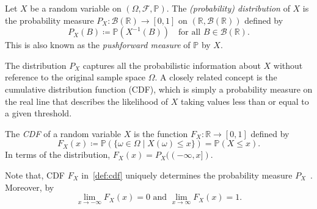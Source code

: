 \begin{definition}
    Let $X$ be a random variable on $(\Omega, \mathcal{F}, \mathbb{P})$. The \emph{(probability) distribution} of $X$ is the probability measure $P_X:\mathcal{B}(\mathbb{R}) \to [0, 1]$ on $(\mathbb{R}, \mathcal{B}(\mathbb{R}))$ defined by
    \[
        P_X(B) \coloneq \mathbb{P}(X^{-1}(B)) \quad \text{for all } B \in \mathcal{B}(\mathbb{R}).
    \]
    This is also known as the \emph{pushforward measure} of $\mathbb{P}$ by $X$.
\end{definition}

The distribution $P_X$ captures all the probabilistic information about $X$ without reference to the original sample space $\Omega$. A closely related concept is the cumulative distribution function (CDF), which is simply a probability measure on the real line that describes the likelihood of $X$ taking values less than or equal to a given threshold.

\begin{definition}
    \label{def:cdf}
    The \emph{CDF} of a random variable $X$ is the function $F_X: \mathbb{R} \to [0, 1]$ defined by
    \[
        F_X(x) \coloneq \mathbb{P}(\{\omega \in \Omega \mid X(\omega) \leq x\}) = \mathbb{P}(X \leq x).
    \]
    In terms of the distribution, $F_X(x) = P_X((-\infty, x])$.
\end{definition}

\begin{remarknl}
    Note that, CDF $F_X$ in~\ref{def:cdf} uniquely determines the probability measure $P_X$~\cite[Thm 12.4]{ProbabilityBillingsley}. Moreover, by~\cite[Sec. 14.4]{ProbabilityBillingsley}
    \[
        \lim_{x \to -\infty}F_X(x) = 0 \text{ and } \lim_{x \to \infty}F_X(x) = 1.
    \]
\end{remarknl}

